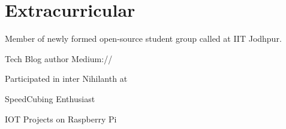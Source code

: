 \documentclass[]{deedy-resume-openfont}
\begin{document}
\begin{minipage}[t]{0.67\textwidth}

\section{Extracurricular} 
\begin{bulletedlist}
\item Member of newly formed open-source student group called  at IIT Jodhpur.
\item Tech Blog author Medium://  \href{https://medium.com/@anshul.ahu/}{} \\
\item Participated in inter  Nihilanth at 
\item SpeedCubing Enthusiast
\item IOT Projects on Raspberry Pi 
\end{bulletedlist}
\end{minipage} 
\end{document}
